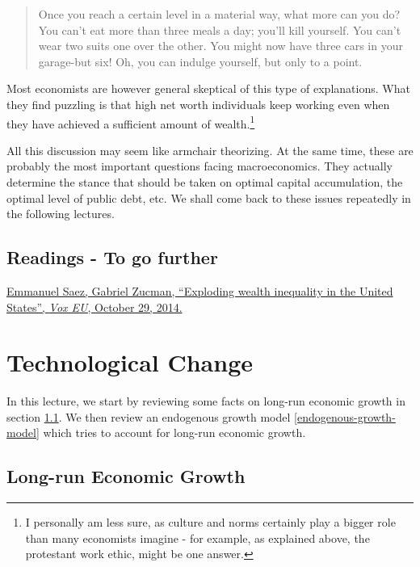\documentclass[]{book}
\let\rmarkdownfootnote\footnote%
\def\footnote{\protect\rmarkdownfootnote}
\begin{document}
\begin{quote}
Once you reach a certain level in a material way, what more can you do?
You can't eat more than three meals a day; you'll kill yourself. You
can't wear two suits one over the other. You might now have three cars
in your garage-but six! Oh, you can indulge yourself, but only to a
point.
\end{quote}

Most economists are however general skeptical of this type of
explanations. What they find puzzling is that high net worth individuals
keep working even when they have achieved a sufficient amount of
wealth.\footnote{I personally am less sure, as culture and norms
  certainly play a bigger role than many economists imagine - for
  example, as explained above, the protestant work ethic, might be one
  answer.}

All this discussion may seem like armchair theorizing. At the same time,
these are probably the most important questions facing macroeconomics.
They actually determine the stance that should be taken on optimal
capital accumulation, the optimal level of public debt, etc. We shall
come back to these issues repeatedly in the following lectures.

\section*{Readings - To go further}\label{readings---to-go-further-3}

\href{https://voxeu.org/article/exploding-wealth-inequality-united-states}{Emmanuel
Saez, Gabriel Zucman, ``Exploding wealth inequality in the United
States'', \emph{Vox EU}, October 29, 2014.}

\chapter{Technological Change}\label{technology}

In this lecture, we start by reviewing some facts on long-run economic
growth in section \ref{long-run-growth}. We then review an endogenous
growth model \ref{endogenous-growth-model} which tries to account for
long-run economic growth.

\section{Long-run Economic Growth}\label{long-run-growth}
\end{document}
